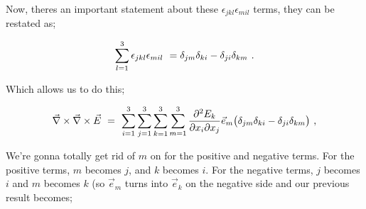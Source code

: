 \documentclass{article}
\begin{document}
Now, theres an important statement about these \begin{math} \epsilon_{jkl}\epsilon_{mil} \end{math} terms, they can be restated as;

\begin{equation} \label{eq:51}
\sum_{l=1}^{3} \epsilon_{jkl}\epsilon_{mil} \hspace{0.125cm} = \delta_{jm}\delta_{ki} - \delta_{ji}\delta_{km} \hspace{0.125cm}.
\end{equation}

Which allows us to do this;

\begin{equation} \label{eq:51}
\vec{\nabla}\times\vec{\nabla}\times\vec{E} \hspace{0.125cm} = \hspace{0.125cm} \sum_{i=1}^{3} \sum_{j=1}^{3} \sum_{k=1}^{3} \sum_{m=1}^{3} \frac{\partial^{2}{E_k}}{\partial{x_i}\partial{x_j}} \vec{e}_m \big(\delta_{jm}\delta_{ki} - \delta_{ji}\delta_{km}\big) \hspace{0.125cm} ,
\end{equation}

We're gonna totally get rid of \begin{math} m \end{math} on for the positive and negative terms. For the positive terms, \begin{math} m \end{math} becomes \begin{math} j \end{math}, and \begin{math} k \end{math} becomes \begin{math} i \end{math}. For the negative terms, \begin{math} j \end{math} becomes \begin{math} i \end{math} and \begin{math} m \end{math} becomes \begin{math} k \end{math} (so \begin{math} \vec{e}_m \end{math} turns into \begin{math} \vec{e}_k \end{math} on the negative side and our previous result becomes;
\end{document}
